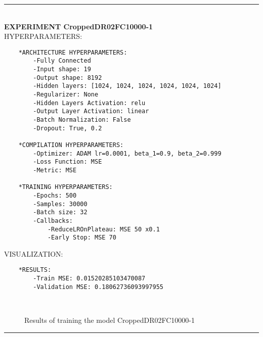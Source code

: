 \rule{0.5\textwidth}{0.5pt}\\

	{\large \textbf{EXPERIMENT CroppedDR02FC10000-1}}\\
	
	{\normalsize HYPERPARAMETERS:}
	\begin{lstlisting}	
	*ARCHITECTURE HYPERPARAMETERS:
		-Fully Connected
		-Input shape: 19
		-Output shape: 8192
		-Hidden layers: [1024, 1024, 1024, 1024, 1024, 1024]
		-Regularizer: None
		-Hidden Layers Activation: relu
		-Output Layer Activation: linear
		-Batch Normalization: False
		-Dropout: True, 0.2
	
	*COMPILATION HYPERPARAMETERS:
		-Optimizer: ADAM lr=0.0001, beta_1=0.9, beta_2=0.999
		-Loss Function: MSE
		-Metric: MSE
	
	*TRAINING HYPERPARAMETERS:
		-Epochs: 500
		-Samples: 30000
		-Batch size: 32
		-Callbacks: 
			-ReduceLROnPlateau: MSE 50 x0.1
			-Early Stop: MSE 70
	\end{lstlisting}
	
	{\normalsize VISUALIZATION:}
	\begin{lstlisting}
	*RESULTS:
        -Train MSE: 0.01520285103470087
        -Validation MSE: 0.18062736093997955
	\end{lstlisting}
	
	\begin{figure*}[ht!]
		\hspace{\fill}
		\hspace{\fill}
		\\
		\caption{Results of training the model CroppedDR02FC10000-1}
	\end{figure*}
	
\FloatBarrier	
\rule{0.5\textwidth}{0.5pt}\\